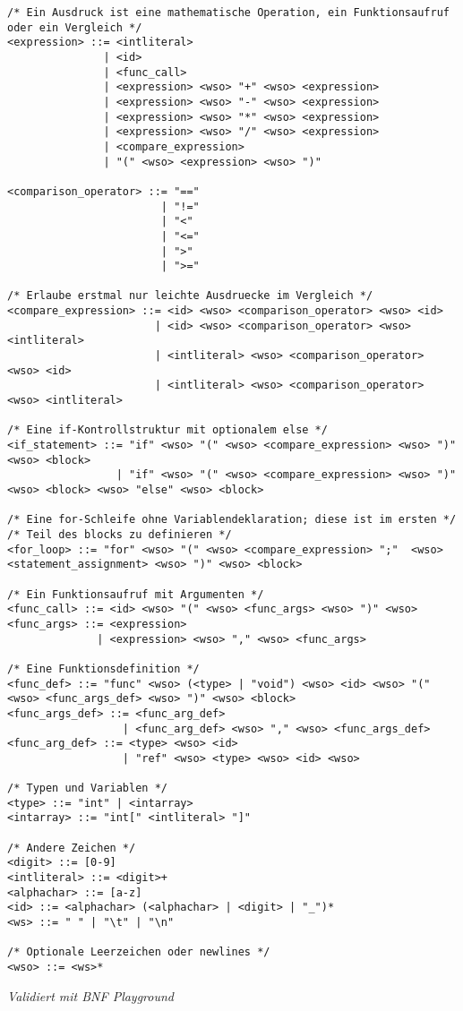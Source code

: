 \begin{lstlisting}
/* Ein Ausdruck ist eine mathematische Operation, ein Funktionsaufruf oder ein Vergleich */
<expression> ::= <intliteral>
               | <id>
               | <func_call>
               | <expression> <wso> "+" <wso> <expression>
               | <expression> <wso> "-" <wso> <expression>
               | <expression> <wso> "*" <wso> <expression>
               | <expression> <wso> "/" <wso> <expression>
               | <compare_expression>
               | "(" <wso> <expression> <wso> ")"

<comparison_operator> ::= "=="
                        | "!="
                        | "<"
                        | "<="
                        | ">"
                        | ">="

/* Erlaube erstmal nur leichte Ausdruecke im Vergleich */
<compare_expression> ::= <id> <wso> <comparison_operator> <wso> <id>
                       | <id> <wso> <comparison_operator> <wso> <intliteral>
                       | <intliteral> <wso> <comparison_operator> <wso> <id>
                       | <intliteral> <wso> <comparison_operator> <wso> <intliteral>

/* Eine if-Kontrollstruktur mit optionalem else */
<if_statement> ::= "if" <wso> "(" <wso> <compare_expression> <wso> ")" <wso> <block>
                 | "if" <wso> "(" <wso> <compare_expression> <wso> ")"  <wso> <block> <wso> "else" <wso> <block>

/* Eine for-Schleife ohne Variablendeklaration; diese ist im ersten */
/* Teil des blocks zu definieren */
<for_loop> ::= "for" <wso> "(" <wso> <compare_expression> ";"  <wso> <statement_assignment> <wso> ")" <wso> <block>

/* Ein Funktionsaufruf mit Argumenten */
<func_call> ::= <id> <wso> "(" <wso> <func_args> <wso> ")" <wso>
<func_args> ::= <expression>
              | <expression> <wso> "," <wso> <func_args>

/* Eine Funktionsdefinition */
<func_def> ::= "func" <wso> (<type> | "void") <wso> <id> <wso> "(" <wso> <func_args_def> <wso> ")" <wso> <block>
<func_args_def> ::= <func_arg_def>
                  | <func_arg_def> <wso> "," <wso> <func_args_def>
<func_arg_def> ::= <type> <wso> <id>
                  | "ref" <wso> <type> <wso> <id> <wso>

/* Typen und Variablen */
<type> ::= "int" | <intarray>
<intarray> ::= "int[" <intliteral> "]"

/* Andere Zeichen */
<digit> ::= [0-9]
<intliteral> ::= <digit>+
<alphachar> ::= [a-z]
<id> ::= <alphachar> (<alphachar> | <digit> | "_")*
<ws> ::= " " | "\t" | "\n"

/* Optionale Leerzeichen oder newlines */
<wso> ::= <ws>*

\end{lstlisting}
\hfil\textit{Validiert mit BNF Playground\cite{paulklineBNFPlayground}}\\

